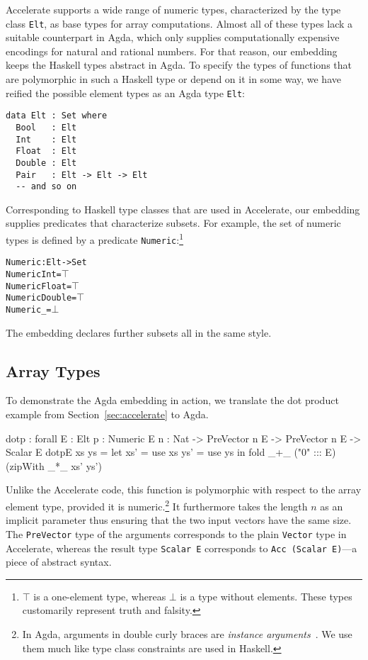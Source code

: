 \documentclass{llncs}
\begin{document}
Accelerate supports a wide range of numeric types, characterized by
the type class \texttt{Elt}, as base types for
array computations. Almost all of these types lack a suitable
counterpart in Agda, which only supplies  computationally expensive
encodings for natural and rational numbers. For that reason, our embedding keeps the Haskell types 
abstract in Agda. To specify the types of functions that are polymorphic in such a Haskell type or depend on it
in some way, we have reified the possible element types as an Agda type
\texttt{Elt}:
\begin{verbatim}
data Elt : Set where
  Bool   : Elt
  Int    : Elt
  Float  : Elt
  Double : Elt
  Pair   : Elt -> Elt -> Elt
  -- and so on
\end{verbatim}
Corresponding to Haskell type classes that are used in Accelerate, our
embedding supplies predicates that characterize subsets. For example,
the set of numeric types is defined by a predicate
\texttt{Numeric}:\footnote{$\top$ is a one-element type,
  whereas $\bot$ is a type without elements. These types customarily
  represent truth and falsity.}
\begin{alltt}
Numeric : Elt -> Set
Numeric Int = \(\top\)
Numeric Float = \(\top\)
Numeric Double = \(\top\)
Numeric _ = \(\bot\)
\end{alltt}
The embedding declares further subsets all in the same style.

\subsection{Array Types}
\label{sec:array-types}

To demonstrate the Agda embedding in action, we translate the
dot product example from Section~\ref{sec:accelerate} to Agda.
\begin{code}
dotp : forall {E : Elt} {{p : Numeric E}} {n : Nat}
     -> PreVector n E -> PreVector n E -> Scalar E
dotp{E} xs ys = 
  let xs' = use xs
      ys' = use ys
  in  fold _+_ ("0" ::: E) (zipWith _*_ xs' ys')
\end{code}
Unlike the Accelerate code, this function is polymorphic with respect
to the array element type, provided it is numeric.\footnote{In Agda, arguments in double curly braces are \emph{instance arguments}~\cite{DevriesePiessens2011}. We use them much like type class constraints are used in Haskell.} It furthermore
takes the length $n$ as an implicit parameter thus ensuring that the two input
vectors have the same size. The \texttt{PreVector} type of the
arguments corresponds to the plain \texttt{Vector} type in Accelerate,
whereas the result type \texttt{Scalar E} corresponds to \texttt{Acc
  (Scalar E)}---a piece of abstract syntax. 
\end{document}
